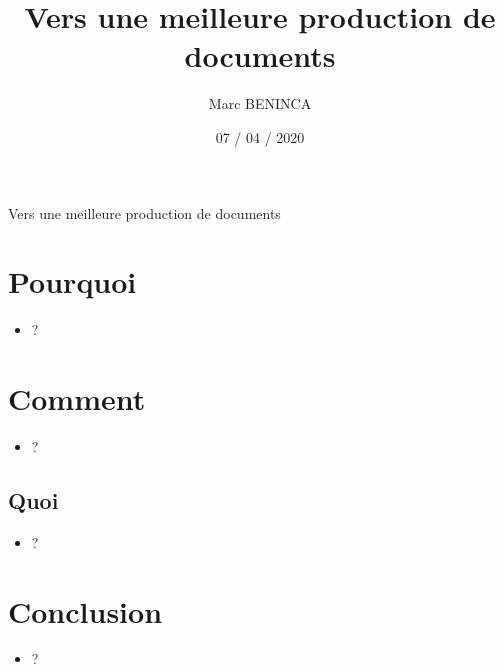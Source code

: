 \documentclass[20pt]{extarticle}
\begin{document}
\title{Vers une meilleure production de documents}
\author{Marc BENINCA}
\date{07 / 04 / 2020}
\maketitle
\pagebreak
Vers une meilleure production de documents
\renewcommand{\contentsname}{Sommaire}
\renewcommand{\cftsecleader}{\hfill}
\renewcommand{\cftsubsecleader}{\hfill}
\tableofcontents
\pagebreak
\section{Pourquoi}
\begin{itemize}
\item{?}
\end{itemize}
\pagebreak
\section{Comment}
\begin{itemize}
\item{?}
\end{itemize}
\pagebreak
\subsection{Quoi}
\begin{itemize}
\item{?}
\end{itemize}
\pagebreak
\section{Conclusion}
\begin{itemize}
\item{?}
\end{itemize}
\pagebreak
\end{document}
